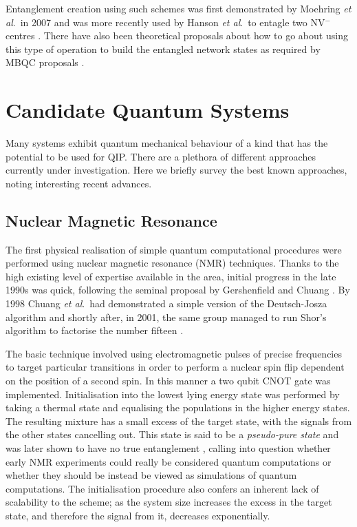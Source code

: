 Entanglement creation using such schemes was first demonstrated by Moehring \textit{et al}.\ in 2007 \cite{Moehring:2007p6099} and was more recently used by Hanson \textit{et al}.\ to entagle two NV$^{-}$ centres \cite{nv_entanglement_hanson}. There have also been theoretical proposals about how to go about using this type of operation to build the entangled network states as required by MBQC proposals \cite{Benjamin:2006p6123}.


\section{Candidate Quantum Systems}

Many systems exhibit quantum mechanical behaviour of a kind that has the potential to be used for QIP. There are a plethora of different approaches currently under investigation. Here we briefly survey the best known approaches, noting interesting recent advances.

\subsection{Nuclear Magnetic Resonance}

The first physical realisation of simple quantum computational procedures were performed using nuclear magnetic resonance (NMR) techniques. Thanks to the high existing level of expertise available in the area, initial progress in the late 1990s was quick, following the seminal proposal by Gershenfield and Chuang \cite{nmr_proposal_chuang_97}.  By 1998 Chuang \textit{et al}.\ had demonstrated a simple version of the Deutsch-Josza algorithm \cite{chuang_first_nmr_realisation_98} and shortly after, in 2001, the same group managed to run Shor's algorithm to factorise the number fifteen \cite{nmr_factorise_15_01}.

The basic technique involved using electromagnetic pulses of precise frequencies to target particular transitions in order to perform a nuclear spin flip dependent on the position of a second spin. In this manner a two qubit CNOT gate was implemented.  Initialisation into the lowest lying energy state was performed by taking a thermal state and equalising the populations in the higher energy states. The resulting mixture has a small excess of the target state, with the signals from the other states cancelling out. This state is said to be a \textit{pseudo-pure state} and was later shown to have no true entanglement \cite{nmr_pseudo_pure}, calling into question whether early NMR experiments could really be considered quantum computations or whether they should be instead be viewed as simulations of quantum computations. The initialisation procedure also confers an inherent lack of scalability to the scheme; as the system size increases the excess in the target state, and therefore the signal from it, decreases exponentially.

